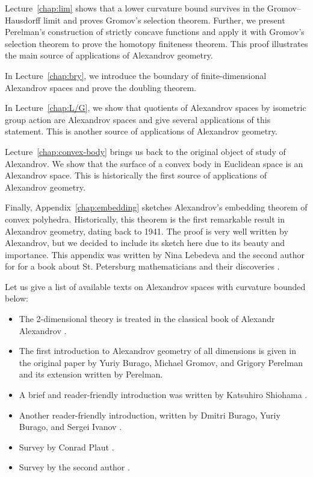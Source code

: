 Lecture~\ref{chap:lim} shows that a lower curvature bound survives in the Gromov--Hausdorff limit and proves Gromov's selection theorem.
Further, we present Perelman's construction of strictly concave functions and apply it with Gromov's selection theorem to prove the homotopy finiteness theorem.
This proof illustrates the main source of applications of Alexandrov geometry.

In Lecture~\ref{chap:bry}, we introduce the boundary of finite-dimensional Alexandrov spaces and prove the doubling theorem.

In Lecture~\ref{chap:L/G}, we show that quotients of Alexandrov spaces by isometric group action are Alexandrov spaces and give several applications of this statement.
This is another source of applications of Alexandrov geometry.

Lecture~\ref{chap:convex-body} brings us back to the original object of study of Alexandrov.
We show that the surface of a convex body in Euclidean space is an Alexandrov space.
This is historically the first source of applications of Alexandrov geometry.

Finally, Appendix~\ref{chap:embedding} sketches Alexandrov's embedding theorem of convex polyhedra.
Historically, this theorem is the first remarkable result in Alexandrov geometry, dating back to 1941.
The proof is very well written by Alexandrov, but we decided to include its sketch here due to its beauty and importance.
This appendix was written by Nina Lebedeva and the second author for  for a book about St. Petersburg mathematicians and their discoveries \cite{kalinin-sinkevich-stolyarov-smirnov}.

Let us give a list of available texts on Alexandrov spaces with curvature bounded below: 
\begin{itemize}
\item The 2-dimensional theory is treated in the classical book of Alexandr Alexandrov \cite{alexandrov-1948}.
\item The first introduction to Alexandrov geometry of all dimensions is given in the original paper by Yuriy Burago, Michael Gromov, and Grigory Perelman \cite{burago-gromov-perelman} 
and its extension \cite{perelman1991} written by Perelman.
\item A brief and reader-friendly introduction was written by Katsuhiro Shiohama \cite[Sections 1--8]{shiohama}.
\item Another reader-friendly introduction, written by Dmitri Burago, Yuriy
Burago, and Sergei Ivanov \cite[Chapter 10]{burago-burago-ivanov}.
\item Survey by Conrad Plaut \cite{plaut:survey}.
\item Survey by the second author \cite{petrunin:survey}.
\end{itemize}

